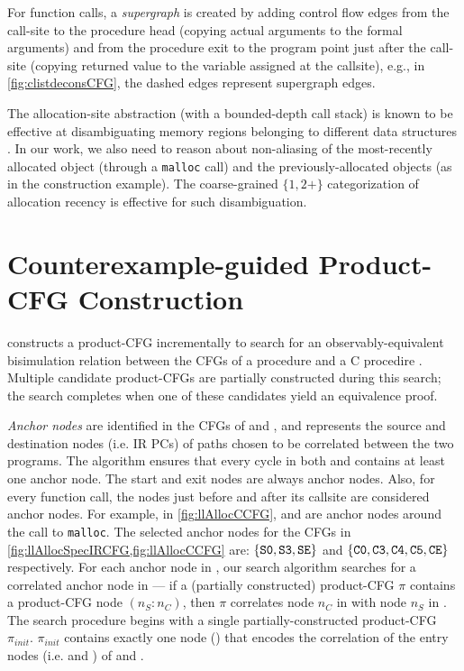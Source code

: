 For function calls, a {\em supergraph} is created by adding control flow edges
from the call-site to the procedure head (copying actual arguments to the formal arguments) and
from the procedure exit to the program point just after the
call-site (copying returned value to the variable assigned at the callsite),
e.g., in \cref{fig:clistdeconsCFG}, the dashed edges represent supergraph edges.

The allocation-site abstraction (with a bounded-depth call stack) is
known to be effective at disambiguating memory regions belonging to
different data structures
\cite{allocationSiteAbstraction82,allocationSiteAbstraction90,allocationSiteAbstraction06}.
In our work, we also need to reason about non-aliasing
of the most-recently allocated object (through a {\tt malloc} call) and
the previously-allocated objects (as in the 
construction example). The coarse-grained $\{1, 2+\}$
categorization of allocation recency is effective for such disambiguation.

\section{Counterexample-guided Product-CFG Construction}
\label{sec:searchalgo}
\toolName{} constructs a product-CFG incrementally to search for an observably-equivalent
bisimulation relation between the CFGs of a \SpecL{} procedure \sprog{} and a C procedire \cprog{}.
Multiple candidate product-CFGs are partially constructed during this search;
the search completes when one of these candidates yield an equivalence proof.

{\em Anchor nodes} are identified in the CFGs of \sprog{} and \cprog{}, and represents the
source and destination nodes (i.e. IR PCs)
of paths chosen to be correlated between the two programs.
The algorithm ensures that every cycle in both \sprog{} and \cprog{} contains at least one anchor node.
The start and exit nodes are always anchor nodes.
Also, for every function call, the nodes just before and after its callsite are considered anchor nodes.
For example, in \cref{fig:llAllocCCFG},  and  are anchor nodes around the call to {\tt malloc}.
The selected anchor nodes for the CFGs in \cref{fig:llAllocSpecIRCFG,fig:llAllocCCFG} are:
$\{ {\tt S0},{\tt S3},{\tt SE} \}$ and $\{ {\tt C0}, {\tt C3}, {\tt C4}, {\tt C5}, {\tt CE} \}$ respectively.
For each anchor node in \cprog{}, our search algorithm searches for a correlated anchor node in \sprog{} --- if
a (partially constructed) product-CFG $\pi$ contains a product-CFG node  $(n_S\!:\!n_C)$, then $\pi$
correlates node $n_C$ in \cprog{} with node $n_S$ in \sprog{}.
The search procedure begins with a single partially-constructed product-CFG $\pi_{init}$.
$\pi_{init}$ contains exactly one node () that encodes the correlation of the entry nodes
(i.e.  and ) of \sprog{} and \cprog{}.

